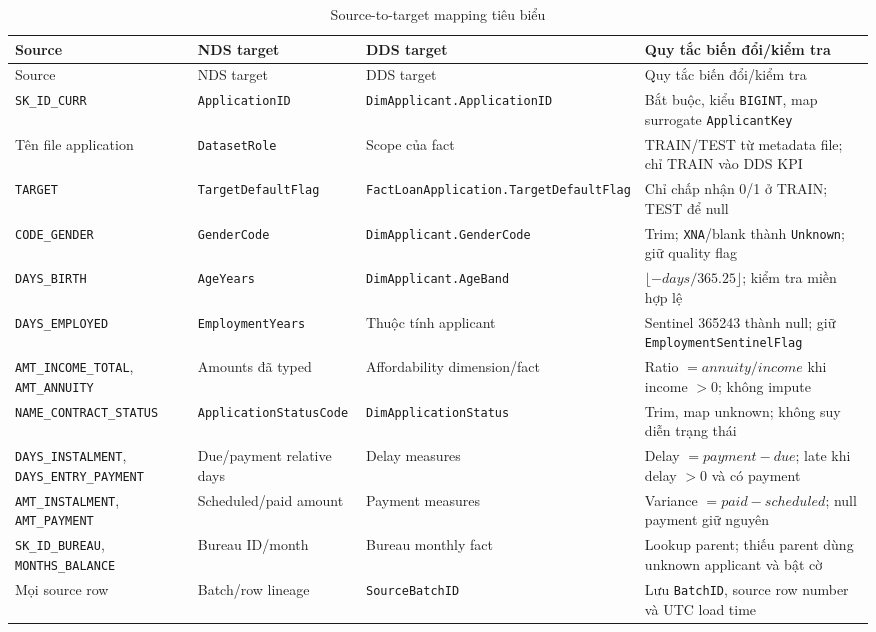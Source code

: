 \documentclass[12pt,a4paper,oneside]{report}
\begin{document}
\begin{longtable}{p{3.2cm}p{3.4cm}p{3.4cm}p{4.5cm}}
\caption{Source-to-target mapping tiêu biểu}\label{tab:source-target}\\
\toprule
Source & NDS target & DDS target & Quy tắc biến đổi/kiểm tra \\
\midrule
\endfirsthead
\toprule Source & NDS target & DDS target & Quy tắc biến đổi/kiểm tra \\
\midrule
\endhead
\texttt{SK\_ID\_CURR} & \texttt{ApplicationID} & \texttt{DimApplicant.ApplicationID} & Bắt buộc, kiểu \texttt{BIGINT}, map surrogate \texttt{ApplicantKey} \\
Tên file application & \texttt{DatasetRole} & Scope của fact & TRAIN/TEST từ metadata file; chỉ TRAIN vào DDS KPI \\
\texttt{TARGET} & \texttt{TargetDefaultFlag} & \texttt{FactLoanApplication.TargetDefaultFlag} & Chỉ chấp nhận 0/1 ở TRAIN; TEST để null \\
\texttt{CODE\_GENDER} & \texttt{GenderCode} & \texttt{DimApplicant.GenderCode} & Trim; \texttt{XNA}/blank thành \texttt{Unknown}; giữ quality flag \\
\texttt{DAYS\_BIRTH} & \texttt{AgeYears} & \texttt{DimApplicant.AgeBand} & $\lfloor -days/365.25\rfloor$; kiểm tra miền hợp lệ \\
\texttt{DAYS\_EMPLOYED} & \texttt{EmploymentYears} & Thuộc tính applicant & Sentinel 365243 thành null; giữ \texttt{EmploymentSentinelFlag} \\
\texttt{AMT\_INCOME\_TOTAL}, \texttt{AMT\_ANNUITY} & Amounts đã typed & Affordability dimension/fact & Ratio $=annuity/income$ khi income $>0$; không impute \\
\texttt{NAME\_CONTRACT\_STATUS} & \texttt{ApplicationStatusCode} & \texttt{DimApplicationStatus} & Trim, map unknown; không suy diễn trạng thái \\
\texttt{DAYS\_INSTALMENT}, \texttt{DAYS\_ENTRY\_PAYMENT} & Due/payment relative days & Delay measures & Delay $=payment-due$; late khi delay $>0$ và có payment \\
\texttt{AMT\_INSTALMENT}, \texttt{AMT\_PAYMENT} & Scheduled/paid amount & Payment measures & Variance $=paid-scheduled$; null payment giữ nguyên \\
\texttt{SK\_ID\_BUREAU}, \texttt{MONTHS\_BALANCE} & Bureau ID/month & Bureau monthly fact & Lookup parent; thiếu parent dùng unknown applicant và bật cờ \\
Mọi source row & Batch/row lineage & \texttt{SourceBatchID} & Lưu \texttt{BatchID}, source row number và UTC load time \\
\bottomrule
\end{longtable}
\end{document}
